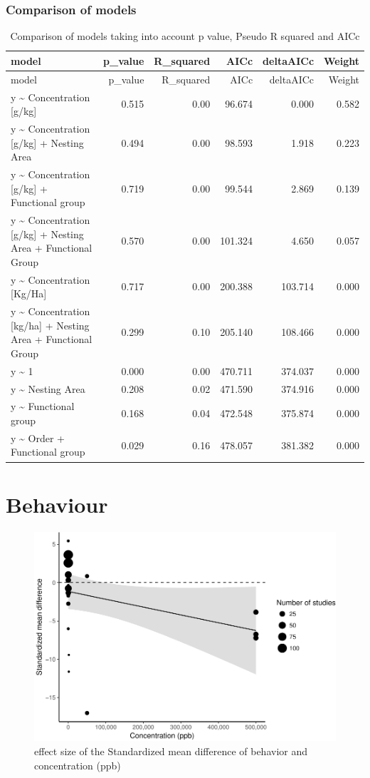 \documentclass[]{elsarticle} %
\makeatletter
\def\maxwidth{\ifdim\Gin@nat@width>\linewidth\linewidth
\else\Gin@nat@width\fi}
\let\Oldincludegraphics\includegraphics
\renewcommand{\includegraphics}[1]{\Oldincludegraphics[width=\maxwidth]{#1}}
\makeatother
\begin{document}
\subsubsection{Comparison of models}\label{comparison-of-models}

\begin{longtable}[c]{@{}lrrrrr@{}}
\caption{Comparison of models taking into account p value, Pseudo R
squared and AICc}\tabularnewline
\toprule
model & p\_value & R\_squared & AICc & deltaAICc & Weight\tabularnewline
\midrule
\endfirsthead
\toprule
model & p\_value & R\_squared & AICc & deltaAICc & Weight\tabularnewline
\midrule
\endhead
y \textasciitilde{} Concentration {[}g/kg{]} & 0.515 & 0.00 & 96.674 &
0.000 & 0.582\tabularnewline
y \textasciitilde{} Concentration {[}g/kg{]} + Nesting Area & 0.494 &
0.00 & 98.593 & 1.918 & 0.223\tabularnewline
y \textasciitilde{} Concentration {[}g/kg{]} + Functional group & 0.719
& 0.00 & 99.544 & 2.869 & 0.139\tabularnewline
y \textasciitilde{} Concentration {[}g/kg{]} + Nesting Area + Functional
Group & 0.570 & 0.00 & 101.324 & 4.650 & 0.057\tabularnewline
y \textasciitilde{} Concentration {[}Kg/Ha{]} & 0.717 & 0.00 & 200.388 &
103.714 & 0.000\tabularnewline
y \textasciitilde{} Concentration {[}kg/ha{]} + Nesting Area +
Functional Group & 0.299 & 0.10 & 205.140 & 108.466 &
0.000\tabularnewline
y \textasciitilde{} 1 & 0.000 & 0.00 & 470.711 & 374.037 &
0.000\tabularnewline
y \textasciitilde{} Nesting Area & 0.208 & 0.02 & 471.590 & 374.916 &
0.000\tabularnewline
y \textasciitilde{} Functional group & 0.168 & 0.04 & 472.548 & 375.874
& 0.000\tabularnewline
y \textasciitilde{} Order + Functional group & 0.029 & 0.16 & 478.057 &
381.382 & 0.000\tabularnewline
\bottomrule
\end{longtable}

\section{Behaviour}\label{behaviour}

\begin{figure}[htbp]
\centering
\includegraphics{MetanalysisNeonics2_files/figure-latex/unnamed-chunk-19-1.pdf}
\caption{effect size of the Standardized mean difference of behavior and
concentration (ppb)}
\end{figure}
\end{document}
